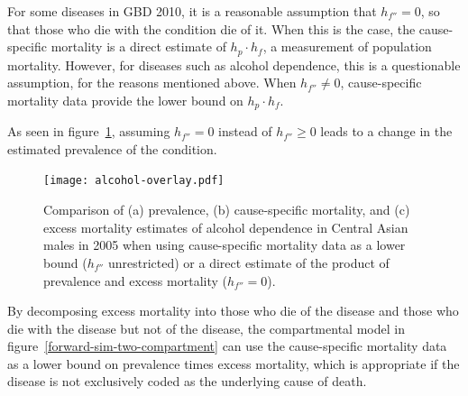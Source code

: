 For some diseases in GBD 2010, it is a reasonable assumption
that $h_{f''} = 0$, so that those who die with the condition die of
it.  When this is the case, the cause-specific mortality is a direct
estimate of $h_{p} \cdot h_{f}$, a measurement of population
mortality.  However, for diseases such as alcohol dependence, this is
a questionable assumption, for the reasons mentioned above.  When
$h_{f''} \neq 0$, cause-specific mortality data provide the lower
bound on $h_{p} \cdot h_{f}$.

As seen in figure~\ref{fig:app-alcohol compare}, assuming $h_{f''}=0$
instead of $h_{f''}\geq 0$ leads to a change in the estimated prevalence
of the condition.

    \begin{figure}[h]
        \begin{center}
            \texttt{[image: alcohol-overlay.pdf]}
            \caption[Comparison of estimates for alcohol dependence when using
              cause-specific mortality data as a lower bound ($h_{f''}$ unrestricted)
              or a direct estimate of the product of
              prevalence and excess mortality ($h_{f''} = 0$).]{Comparison of (a) prevalence,
              (b) cause-specific mortality, and (c) excess
              mortality estimates of alcohol
              dependence in Central Asian males in 2005 when using
              cause-specific mortality data as a lower bound ($h_{f''}$ unrestricted)
              or a direct estimate of the product of
              prevalence and excess mortality ($h_{f''} = 0$).}
            \label{fig:app-alcohol compare}
        \end{center}
    \end{figure}

By decomposing excess mortality into those who die of the
disease and those who die with the disease but not of the disease, the
compartmental model in figure~\ref{forward-sim-two-compartment} can
use the cause-specific mortality data as a lower bound on prevalence
times excess mortality, which is appropriate if the
disease is not exclusively coded as the underlying cause of death. 